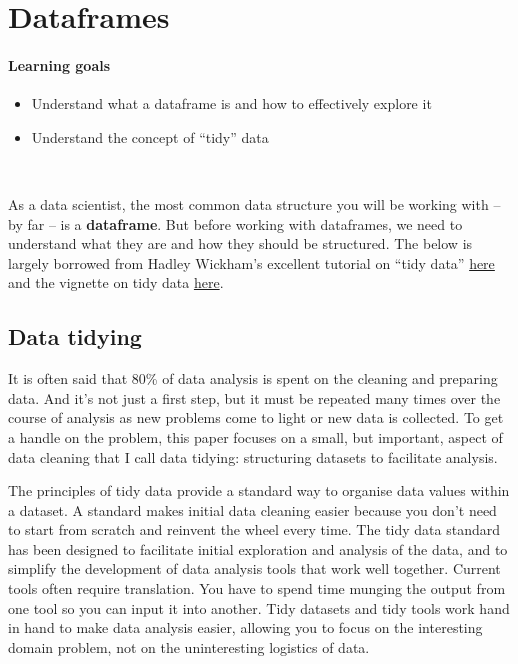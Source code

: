 \documentclass[
]{book}
\providecommand{\tightlist}{%
  \setlength{\itemsep}{0pt}\setlength{\parskip}{0pt}}
\begin{document}
\hypertarget{dataframes}{%
\chapter{Dataframes}\label{dataframes}}

\hypertarget{learning-goals-5}{%
\subsubsection*{Learning goals}\label{learning-goals-5}}

\begin{itemize}
\tightlist
\item
  Understand what a dataframe is and how to effectively explore it
\item
  Understand the concept of ``tidy'' data
\end{itemize}

~

As a data scientist, the most common data structure you will be working with -- by far -- is a \textbf{dataframe}. But before working with dataframes, we need to understand what they are and how they should be structured. The below is largely borrowed from Hadley Wickham's excellent tutorial on ``tidy data'' \href{https://r4ds.had.co.nz/tidy-data.html}{here} and the vignette on tidy data \href{https://cran.r-project.org/web/packages/tidyr/vignettes/tidy-data.html}{here}.

\hypertarget{data-tidying}{%
\section{Data tidying}\label{data-tidying}}

It is often said that 80\% of data analysis is spent on the cleaning and preparing data. And it's not just a first step, but it must be repeated many times over the course of analysis as new problems come to light or new data is collected. To get a handle on the problem, this paper focuses on a small, but important, aspect of data cleaning that I call data tidying: structuring datasets to facilitate analysis.

The principles of tidy data provide a standard way to organise data values within a dataset. A standard makes initial data cleaning easier because you don't need to start from scratch and reinvent the wheel every time. The tidy data standard has been designed to facilitate initial exploration and analysis of the data, and to simplify the development of data analysis tools that work well together. Current tools often require translation. You have to spend time munging the output from one tool so you can input it into another. Tidy datasets and tidy tools work hand in hand to make data analysis easier, allowing you to focus on the interesting domain problem, not on the uninteresting logistics of data.
\end{document}
